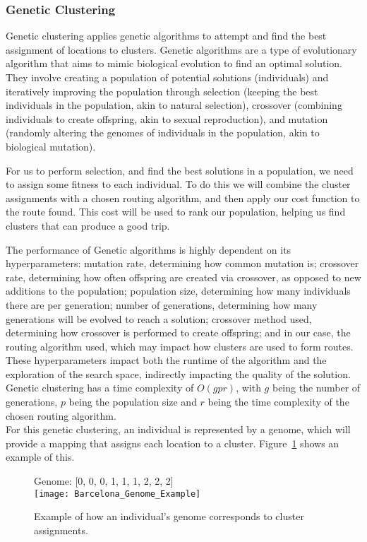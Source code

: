 \subsubsection{Genetic Clustering}
Genetic clustering applies genetic algorithms to attempt and find the best assignment of locations to clusters.
Genetic algorithms are a type of evolutionary algorithm that aims to mimic biological evolution to find an optimal
solution.
They involve creating a population of potential solutions (individuals) and iteratively improving the population
through selection (keeping the best individuals in the population, akin to natural selection), crossover (combining
individuals to create offspring, akin to sexual reproduction), and mutation (randomly altering the genomes
of individuals in the population, akin to biological mutation).

For us to perform selection, and find the best solutions in a population, we need to assign some fitness to each
individual.
To do this we will combine the cluster assignments with a chosen routing algorithm, and then apply our cost function
to the route found.
This cost will be used to rank our population, helping us find clusters that can produce a good trip.

The performance of Genetic algorithms is highly dependent on its hyperparameters: mutation rate, determining how
common mutation is; crossover rate, determining how often offspring are created via crossover, as opposed to new
additions to the population; population size, determining how many individuals there are per generation; number of
generations, determining how many generations will be evolved to reach a solution; crossover method used,
determining how crossover is performed to create offspring; and in our case, the routing algorithm used, which may
impact how clusters are used to form routes.
These hyperparameters impact both the runtime of the algorithm and the exploration of the search space, indirectly
impacting the quality of the solution.
Genetic clustering has a time complexity of $O(gpr)$, with $g$ being the number of generations, $p$ being the
population size and $r$ being the time complexity of the chosen routing algorithm.\\

\noindent
For this genetic clustering, an individual is represented by a genome, which will provide a mapping that assigns each
location to a cluster.
Figure~\ref{fig:barcelona-genome-example} shows an example of this.
\begin{figure}[H]
    \centering
    Genome: [0, 0, 0, 1, 1, 1, 2, 2, 2]\\
    \texttt{[image: Barcelona\_Genome\_Example]}
    \caption{Example of how an individual's genome corresponds to cluster assignments.}
    \label{fig:barcelona-genome-example}
\end{figure}

